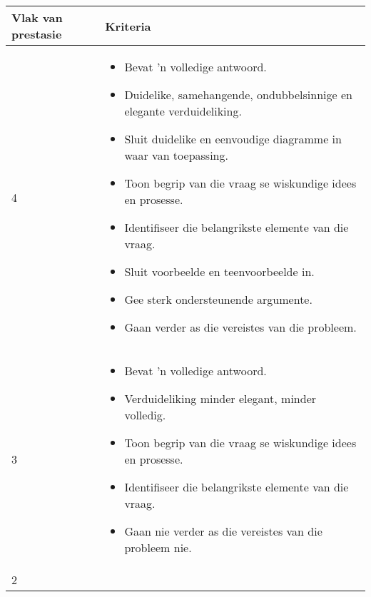 \begin{table}[H]
 \begin{center}
  \begin{tabular}{|p{3cm}|p{8.5cm}|} \hline
\textbf{Vlak van prestasie}& \textbf{Kriteria} \\ \hline
4 &
\begin{itemize}[noitemsep]
\item
  Bevat 'n volledige antwoord.
\item
  Duidelike, samehangende, ondubbelsinnige en elegante verduideliking.
\item
  Sluit duidelike en eenvoudige diagramme in waar van toepassing.
\item
  Toon begrip van die vraag se wiskundige idees en prosesse.
\item
   Identifiseer die belangrikste elemente van die vraag.
\item
  Sluit voorbeelde en teenvoorbeelde in.
\item
   Gee sterk ondersteunende argumente.
\item
  Gaan verder as die vereistes van die probleem.
   \end{itemize} \\ \hline
3 & 
\begin{itemize}[noitemsep]
\item
  Bevat 'n volledige antwoord.
\item
  Verduideliking minder elegant, minder volledig.
\item
  Toon begrip van die vraag se wiskundige idees en prosesse.
\item
  Identifiseer die belangrikste elemente van die vraag.
\item
  Gaan nie verder as die vereistes van die probleem nie.
\end{itemize} \\ \hline
2 &
\begin{itemize}[noitemsep]

\end{itemize}
\end{tabular}
\end{center}
\end{table}
